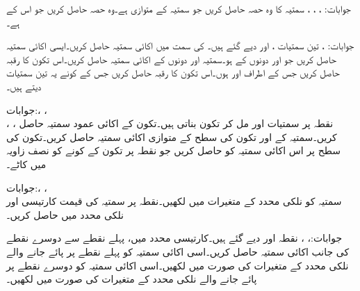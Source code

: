 جوابات: ، ، ، 
سمتیہ  کا وہ حصہ حاصل کریں جو سمتیہ  کے متوازی ہے۔وہ حصہ حاصل کریں جو اس کے  ہے۔ 

جوابات: ، 
تین سمتیات ،  اور  دیے گئے ہیں۔ کی سمت میں اکائی سمتیہ حاصل کریں۔ایسی اکائی سمتیہ حاصل کریں جو  اور  دونوں کے   ہو۔سمتیہ  اور  دونوں کے    اکائی سمتیہ حاصل کریں۔اس تکون کا رقبہ حاصل کریں جس کے اطراف  اور  ہوں۔اس تکون کا رقبہ حاصل کریں جس کے کونے یہ تین سمتیات دیتے ہیں۔ 

جوابات:، ، \\
، ، 
نقطہ  پر سمتیات  اور  مل کر تکون بناتی ہیں۔تکون کے  اکائی  عمود سمتیہ حاصل کریں۔سمتیہ  کے  اور تکون کی سطح کے متوازی اکائی سمتیہ حاصل کریں۔تکون کی سطح پر اس اکائی سمتیہ کو حاصل کریں جو نقطہ  پر تکون کے کونے کو نصف زاویہ میں کاٹے۔

جوابات:، ، \\
سمتیہ  کو نلکی محدد کے متغیرات میں لکھیں۔نقطہ  پر سمتیہ کی قیمت کارتیسی اور نلکی محدد میں حاصل کریں۔

جوابات:، ، 
نقطہ  اور  دیے گئے ہیں۔کارتیسی محدد میں، پہلے نقطے سے دوسرے نقطے کی جانب اکائی سمتیہ حاصل کریں۔اسی اکائی سمتیہ کو پہلے نقطے پر پائے جانے والے نلکی محدد کے متغیرات کی صورت میں لکھیں۔اسی اکائی سمتیہ کو دوسرے نقطے پر پائے جانے والے نلکی محدد کے متغیرات کی صورت میں لکھیں۔

